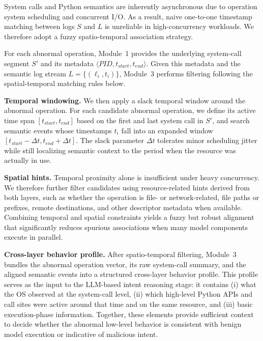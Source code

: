 System calls and Python semantics are inherently asynchronous due to operation system scheduling and concurrent I/O. As a result, naive one-to-one timestamp matching between logs $S$ and $L$ is unreliable in high-concurrency workloads. We therefore adopt a fuzzy spatio-temporal association strategy.

For each abnormal operation, Module~1 provides the underlying system-call segment $S'$ and its metadata $\langle \textit{PID}, t_{\textit{start}}, t_{\textit{end}} \rangle$. Given this metadata and the semantic log stream $L = \{(\ell_i, t_i)\}$, Module~3 performs filtering following the spatial-temporal matching rules below.

\noindent \textbf{Temporal windowing.} We then apply a slack temporal window around the abnormal operation. For each candidate abnormal operation, we define its active time span $[t_{\textit{start}}, t_{\textit{end}}]$ based on the first and last system call in $S'$, and search semantic events whose timestamps $t_i$ fall into an expanded window $[t_{\textit{start}} - \Delta t, t_{\textit{end}} + \Delta t]$. The slack parameter $\Delta t$ tolerates minor scheduling jitter while still localizing semantic context to the period when the resource was actually in use.

\noindent \textbf{Spatial hints.} Temporal proximity alone is insufficient under heavy concurrency. We therefore further filter candidates using resource-related hints derived from both layers, such as whether the operation is file- or network-related, file paths or prefixes, remote destinations, and other descriptor metadata when available. Combining temporal and spatial constraints yields a fuzzy but robust alignment that significantly reduces spurious associations when many model components execute in parallel.

\noindent \textbf{Cross-layer behavior profile.} After spatio-temporal filtering, Module~3 bundles the abnormal operation vector, its raw system-call summary, and the aligned semantic events into a structured cross-layer behavior profile. This profile serves as the input to the LLM-based intent reasoning stage: it contains (i) what the OS observed at the system-call level, (ii) which high-level Python APIs and call sites were active around that time and on the same resource, and (iii) basic execution-phase information. Together, these elements provide sufficient context to decide whether the abnormal low-level behavior is consistent with benign model execution or indicative of malicious intent.

